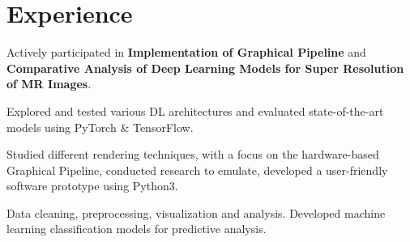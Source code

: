 \documentclass[]{resume}
\begin{document}


%
%

\begin{minipage}[t]{0.5\textwidth}


    \section{Experience}


    \vspace{\topsep} %
    \begin{tightemize}
        \sectionsep
        \item Actively participated in \textbf{Implementation of Graphical Pipeline} and \textbf{Comparative Analysis of Deep Learning Models for Super Resolution of MR Images}.
        \item Explored and tested various DL architectures and evaluated state-of-the-art models using PyTorch \& TensorFlow.
        \item Studied different rendering techniques, with a focus on the hardware-based Graphical Pipeline, conducted research to emulate, developed a user-friendly software prototype using Python3.
    \end{tightemize}


    \begin{tightemize}
        \sectionsep
        \item Data cleaning, preprocessing, visualization and analysis. Developed machine learning classification models for predictive analysis.
    \end{tightemize}


\end{minipage}
\end{document}
